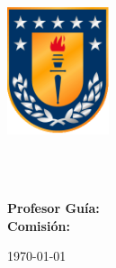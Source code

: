 \begin{titlepage}

{\sffamily

\begin{center}

\includegraphics[width=30mm]{figures/escudo.png}

\vfill\vfill\vfill
\vfill\vfill\vfill

{\LARGE\bfseries\mytitle}

\vfill\vfill\vfill

{\bfseries\myauthor} \\
\myinstitute \\
\myuniversity
\vfill\vfill\vfill
\vfill\vfill\vfill

{\bfseries Profesor Guía: \mysupervisor} \\
{\bfseries Comisión: \myevaluator}

\today

\vfill
\vfill
\vfill
\vfill
\vfill
\vfill
\vfill
\vfill
\vfill
\vfill
\vfill
\vfill
\vfill
\vfill
\vfill
\vfill
\vfill
\vfill
\vfill
\vfill

\end{center}
}%
\end{titlepage}


